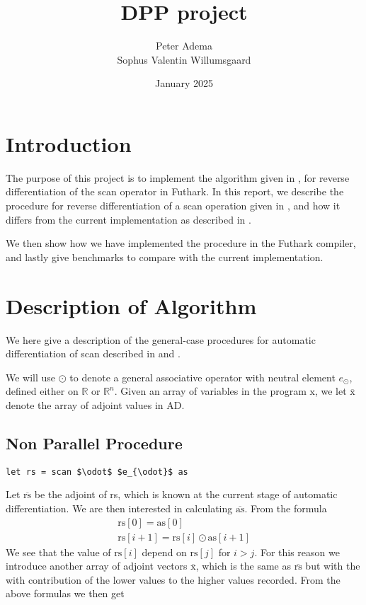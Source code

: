 \documentclass{article}
\title{DPP project}
\author{Peter Adema \\
Sophus Valentin Willumsgaard}
\date{January 2025}
\newcommand{\ors}{\overline{\text{rs}}}
\newcommand{\rs}{\text{rs}}
\newcommand{\oas}{\overline{\text{as}}}
\newcommand{\xo}{\overline{\text{x}}}
\newcommand{\as}{\text{as}}
\begin{document}
\maketitle
\tableofcontents
\section{Introduction}
The purpose of this project is to implement the algorithm given in \cite{PPAD}, for reverse
differentiation of the scan operator in Futhark.
In this report,
we describe the procedure for reverse differentiation of a
scan operation given in \cite{PPAD},
and how it differs from the current implementation as described in
\cite{Futhark}.

We then show how we have implemented the procedure in the Futhark compiler,
and lastly give benchmarks to compare with the current implementation.
\section{Description of Algorithm}
We here give a description of the general-case procedures for automatic differentiation of
scan described in \cite{PPAD} and \cite{Futhark}.

We will use \(\odot\) to denote a general associative operator with neutral
element \(e_{\odot}\), defined either on \(\mathbb{R}\) or \(\mathbb{R}^{n}\).
Given an array of variables in the program \(\text{x}\),
we let \(\xo\) denote the array of adjoint values in AD.
\subsection{Non Parallel Procedure}




\begin{lstlisting}[mathescape=true]
   let rs = scan $\odot$ $e_{\odot}$ as
\end{lstlisting}
Let \(\ors\) be the adjoint of rs, which is known at the current stage of
automatic differentiation.
We are then interested in calculating \(\oas\).
From the formula
\begin{align*}
	\rs [0] = \as[0] \\
	\rs [i+1] = \rs[i] \odot \as[i+1]
\end{align*}
We see that the value of \(\rs[i]\) depend on \(\rs[j]\) for \(i>j\).
For this reason we introduce another array of adjoint vectors \(\xo\),
which is the same as \(\ors\) but with the with contribution of the lower
values to the higher values recorded.
From the above formulas we then get
\end{document}
